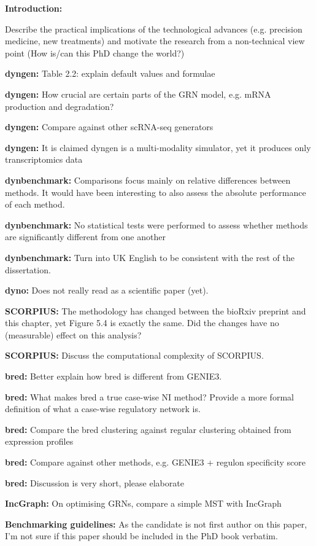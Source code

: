 \documentclass[10pt]{article}
\begin{document}
\textbf{Introduction:} {Describe the practical implications of the
		technological advances (e.g. precision medicine, new treatments) and
		motivate the research from a non-technical view point (How is/can this PhD
		change the world?)
	
\textbf{dyngen:} {Table 2.2: explain default values and formulae}

\textbf{dyngen:} {How crucial are certain parts of the GRN model, e.g. mRNA production and degradation?}

\textbf{dyngen:} {Compare against other scRNA-seq generators}

\textbf{dyngen:} {It is claimed dyngen is a multi-modality simulator, yet it produces only transcriptomics data}

\textbf{dynbenchmark:} {Comparisons focus mainly on relative differences between methods. It would have been interesting to also assess the absolute performance of each method.}

\textbf{dynbenchmark:} {No statistical tests were performed to assess whether methods are significantly different from one another}

\textbf{dynbenchmark:} Turn into UK English to be consistent with the rest of the dissertation.

\textbf{dyno:} {Does not really read as a scientific paper (yet).}

\textbf{SCORPIUS:} {The methodology has changed between the bioRxiv preprint and this chapter, yet Figure 5.4 is exactly the same. Did the changes have no (measurable) effect on this analysis?}

\textbf{SCORPIUS:} {Discuss the computational complexity of SCORPIUS.}

\textbf{bred:} {Better explain how bred is different from GENIE3.}

\textbf{bred:} {What makes bred a true case-wise NI method? Provide a more formal definition of what a case-wise regulatory network is.}

\textbf{bred:} {Compare the bred clustering against regular clustering obtained from expression profiles}

\textbf{bred:} {Compare against other methods, e.g. GENIE3 + regulon specificity score}

\textbf{bred:} {Discussion is very short, please elaborate}

\textbf{IncGraph:} {On optimising GRNs, compare a simple MST with IncGraph}

\textbf{Benchmarking guidelines:} {As the candidate is not first author on this paper, I’m not sure if this paper
	should be included in the PhD book verbatim.}

}
\end{document}
